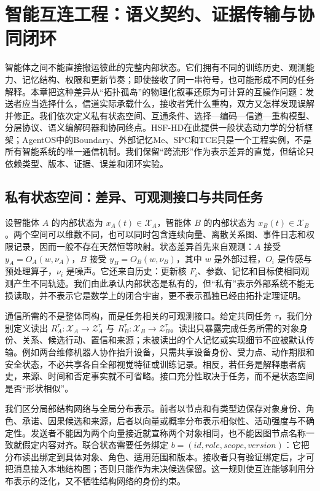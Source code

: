 \chapter{智能互连工程：语义契约、证据传输与协同闭环}
\label{chp:interconnection_engineering}

智能体之间不能直接搬运彼此的完整内部状态。它们拥有不同的训练历史、观测能力、记忆结构、权限和更新节奏；即使接收了同一串符号，也可能形成不同的任务解释。本章把这种差异从“拓扑孤岛”的物理化叙事还原为可计算的互操作问题：发送者应当选择什么，信道实际承载什么，接收者凭什么重构，双方又怎样发现误解并修正。我们依次定义私有状态空间、互通条件、选择—编码—信道—重构模型、分层协议、语义编解码器和协同终点。HSF-HD在此提供一般状态动力学的分析框架；AgentOS中的Boundary、外部记忆Me、SPC和TCE只是一个工程实例，不是所有智能系统的唯一通信机制。我们保留“跨流形”作为表示差异的直觉，但结论只依赖类型、版本、证据、误差和闭环实验。

\section{私有状态空间：差异、可观测接口与共同任务}
\label{sec:physics_of_loneliness}

设智能体 $A$ 的内部状态为 $x_A(t)\in\mathcal X_A$，智能体 $B$ 的内部状态为 $x_B(t)\in\mathcal X_B$。两个空间可以维数不同，也可以同时包含连续向量、离散关系图、事件日志和权限记录，因而一般不存在天然恒等映射。状态差异首先来自观测：$A$ 接受 $y_A=O_A(w,\nu_A)$，$B$ 接受 $y_B=O_B(w,\nu_B)$，其中 $w$ 是外部过程，$O_i$ 是传感与预处理算子，$\nu_i$ 是噪声。它还来自历史：更新核 $F_i$、参数、记忆和目标使相同观测产生不同轨迹。我们由此承认内部状态是私有的，但“私有”表示外部系统不能无损读取，并不表示它是数学上的闭合宇宙，更不表示孤独已经由拓扑定理证明。

通信所需的不是整体同构，而是任务相关的可观测接口。给定共同任务 $\tau$，我们分别定义读出 $R_A^\tau:\mathcal X_A\to\mathcal Z_A^\tau$ 与 $R_B^\tau:\mathcal X_B\to\mathcal Z_B^\tau$。读出只暴露完成任务所需的对象身份、关系、候选行动、置信和来源；未被读出的个人记忆或实现细节不应被默认传输。例如两台维修机器人协作抬升设备，只需共享设备身份、受力点、动作期限和安全状态，不必共享各自全部视觉特征或训练记录。相反，若任务是解释患者病史，来源、时间和否定事实就不可省略。接口充分性取决于任务，而不是状态空间是否“形状相似”。

我们区分局部结构网络与全局分布表示。前者以节点和有类型边保存对象身份、角色、承诺、因果候选和来源，后者以向量或概率分布表示相似性、活动强度与不确定性。发送者不能因为两个向量接近就宣称两个对象相同，也不能因图节点名称一致就假定内容对齐。联合状态需要任务绑定 $b=(id,role,scope,version)$：它把分布读出绑定到具体对象、角色、适用范围和版本。接收者只有验证绑定后，才可把消息接入本地结构图；否则只能作为未决候选保留。这一规则使互连能够利用分布表示的泛化，又不牺牲结构网络的身份约束。

